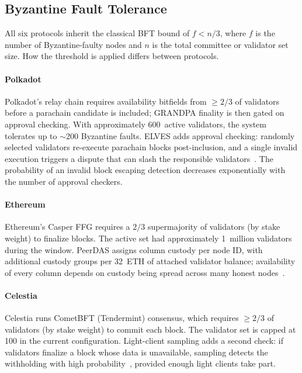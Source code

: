 
\subsection{Byzantine Fault Tolerance}
\label{sec:security-bft}

All six protocols inherit the classical BFT bound of $f < n/3$, where $f$ is the number of Byzantine-faulty nodes and $n$ is the total committee or validator set size.
How the threshold is applied differs between protocols.

\paragraph{Polkadot}
Polkadot's relay chain requires availability bitfields from $\geq 2/3$ of validators before a parachain candidate is included; GRANDPA finality is then gated on approval checking.
With approximately 600~active validators, the system tolerates up to $\sim$200 Byzantine faults.
ELVES adds approval checking: randomly selected validators re-execute parachain blocks post-inclusion, and a single invalid execution triggers a dispute that can slash the responsible validators~\cite{Jeff_Burdges_ELVES}.
The probability of an invalid block escaping detection decreases exponentially with the number of approval checkers.

\paragraph{Ethereum}
Ethereum's Casper FFG requires a $2/3$ supermajority of validators (by stake weight) to finalize blocks.
The active set had approximately 1~million validators during the window.
PeerDAS assigns column custody per node ID, with additional custody groups per 32~ETH of attached validator balance; availability of every column depends on custody being spread across many honest nodes~\cite{EIP-7594}.

\paragraph{Celestia}
Celestia runs CometBFT (Tendermint) consensus, which requires $\geq 2/3$ of validators (by stake weight) to commit each block.
The validator set is capped at 100 in the current configuration.
Light-client sampling adds a second check: if validators finalize a block whose data is unavailable, sampling detects the withholding with high probability~\cite{AlBassam_FraudDA}, provided enough light clients take part.

